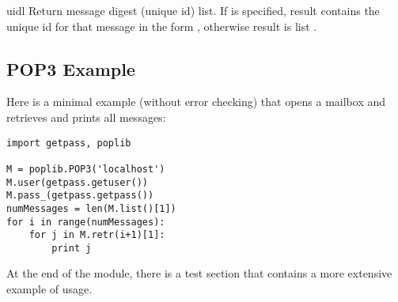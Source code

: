 \begin{methoddesc}{uidl}{}
Return message digest (unique id) list.
If  is specified, result contains the unique id for that
message in the form ,
otherwise result is list .
\end{methoddesc}


\subsection{POP3 Example \label{pop3-example}}

Here is a minimal example (without error checking) that opens a
mailbox and retrieves and prints all messages:

\begin{verbatim}
import getpass, poplib

M = poplib.POP3('localhost')
M.user(getpass.getuser())
M.pass_(getpass.getpass())
numMessages = len(M.list()[1])
for i in range(numMessages):
    for j in M.retr(i+1)[1]:
        print j
\end{verbatim}

At the end of the module, there is a test section that contains a more
extensive example of usage.
